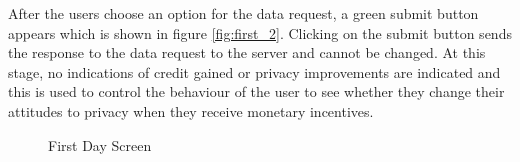 After the users choose an option for the data request, a green submit button appears which is shown in figure \ref{fig:first_2}. Clicking on the submit button sends the response to the data request to the server and cannot be changed. At this stage, no indications of credit gained or privacy improvements are indicated and this is used to control the behaviour of the user to see whether they change their attitudes to privacy when they receive monetary incentives.

\begin{figure}[htp]
  \hspace{3em}
  \caption{First Day Screen}
  \label{fig:first}
\end{figure}


